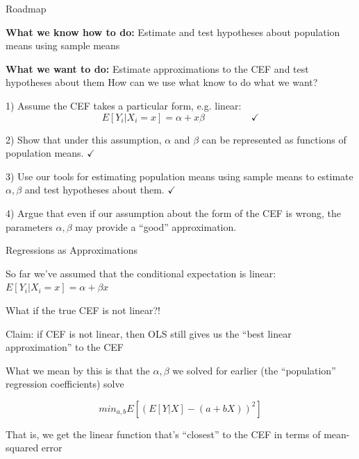 \documentclass[11pt,english,handout]{beamer}
\newenvironment{wideitemize}{\itemize\addtolength{\itemsep}{10pt}}{\enditemize}
\begin{document}
\begin{frame}{Roadmap}
	\begin{wideitemize}
		\item \textbf{What we know how to do:} Estimate and test hypotheses about population means using sample means
		\item \textbf{What we want to do:} Estimate approximations to the CEF and test hypotheses about them 
	\end{wideitemize}
	\bigskip
	How can we use what know to do what we want? 
	
	\begin{wideitemize}
		\item 1) Assume the CEF takes a particular form, e.g. linear:
		$$E[Y_i | X_i = x] = \alpha + x \beta \hspace{2cm }\checkmark$$
		
		\item 2) Show that under this assumption, $\alpha$ and $\beta$ can be represented as functions of population means. $\checkmark$
		
		\item
		3) Use our tools for estimating population means using sample means to estimate $\alpha,\beta$ and test hypotheses about them. $\checkmark$
		
		\item
		4) Argue that even if our assumption about the form of the CEF is wrong, the parameters $\alpha,\beta$ may provide a ``good'' approximation.
	\end{wideitemize}
	
\end{frame}



\begin{frame}{Regressions as Approximations}
	\begin{wideitemize}
	\item
	So far we've assumed that the conditional expectation is linear: $E[Y_i | X_i = x]  = \alpha + \beta x$
	
	\item
	What if the true CEF is not linear?!
	
	\pause
	\item
	Claim: if CEF is not linear, then OLS still gives us the ``best linear approximation'' to the CEF 
	\pause 
	\item
	 What we mean by this is that the $\alpha,\beta$ we solved for earlier (the ``population'' regression coefficients) solve
	 
	 $$min_{a,b} E[ (E[Y|X]  - (a + b X) )^2 ]$$
	 
	 \pause
	 That is, we get the linear function that's ``closest'' to the CEF in terms of mean-squared error
	\end{wideitemize}
\end{frame}
\end{document}
